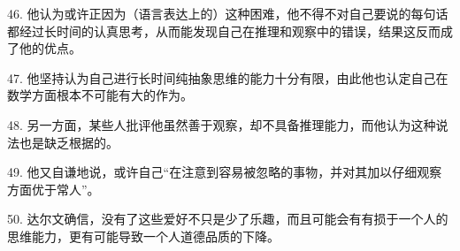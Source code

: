 46. 他认为或许正因为（语言表达上的）这种困难，他不得不对自己要说的每句话都经过长时间的认真思考，从而能发现自己在推理和观察中的错误，结果这反而成了他的优点。

47. 他坚持认为自己进行长时间纯抽象思维的能力十分有限，由此他也认定自己在数学方面根本不可能有大的作为。

48. 另一方面，某些人批评他虽然善于观察，却不具备推理能力，而他认为这种说法也是缺乏根据的。

49. 他又自谦地说，或许自己“在注意到容易被忽略的事物，并对其加以仔细观察方面优于常人”。

50. 达尔文确信，没有了这些爱好不只是少了乐趣，而且可能会有有损于一个人的思维能力，更有可能导致一个人道德品质的下降。
